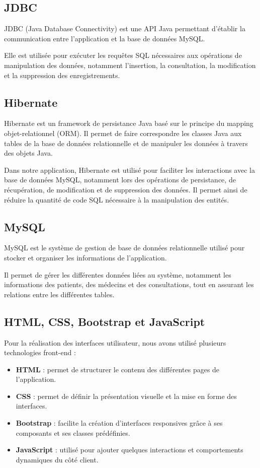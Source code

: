 \subsection{JDBC}
JDBC (Java Database Connectivity) est une API Java permettant d'établir la communication entre l'application et la base de données MySQL.

Elle est utilisée pour exécuter les requêtes SQL nécessaires aux opérations de manipulation des données, notamment l'insertion, la consultation, la modification et la suppression des enregistrements.


\subsection{Hibernate }
Hibernate est un framework de persistance Java basé sur le principe du mapping objet-relationnel (ORM). Il permet de faire correspondre les classes Java aux tables de la base de données relationnelle et de manipuler les données à travers des objets Java.

Dans notre application, Hibernate est utilisé pour faciliter les interactions avec la base de données MySQL, notamment lors des opérations de persistance, de récupération, de modification et de suppression des données. Il permet ainsi de réduire la quantité de code SQL nécessaire à la manipulation des entités.

\subsection{MySQL}
MySQL est le système de gestion de base de données relationnelle utilisé pour stocker et organiser les informations de l'application.

Il permet de gérer les différentes données liées au système, notamment les informations des patients, des médecins et des consultations, tout en assurant les relations entre les différentes tables.

\subsection{HTML, CSS, Bootstrap et JavaScript}
Pour la réalisation des interfaces utilisateur, nous avons utilisé plusieurs technologies front-end :
\begin{itemize}
\item \textbf{ HTML }: permet de structurer le contenu des différentes pages de l'application.
\item \textbf{CSS} : permet de définir la présentation visuelle et la mise en forme des interfaces.
\item \textbf{Bootstrap} : facilite la création d'interfaces responsives grâce à ses composants et ses classes prédéfinies.
\item \textbf{JavaScript} : utilisé pour ajouter quelques interactions et comportements dynamiques du côté client.
\end{itemize}
